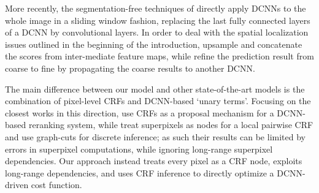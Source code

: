 
More recently, the segmentation-free techniques of \citep{long2014fully, eigen2014predicting} directly apply DCNNs to the whole image in a sliding window fashion, replacing the last fully connected layers of a DCNN  by convolutional layers. In order to deal with the spatial localization issues outlined in the beginning of the introduction, \citet{long2014fully} upsample and concatenate the scores from inter-mediate feature maps, while \citet{eigen2014predicting} refine the prediction result from coarse to fine by propagating the coarse results to another DCNN. 


The main difference between our model and other state-of-the-art models is the combination of pixel-level CRFs and DCNN-based `unary terms'. Focusing on the closest works in this direction, \citet{cogswell2014combining} use CRFs as a proposal mechanism for a DCNN-based reranking system, while \citet{farabet2013learning} treat superpixels as  nodes for a local pairwise CRF and use graph-cuts for discrete inference; as such their results can be limited by errors in superpixel computations, while ignoring  long-range superpixel dependencies. Our approach instead treats every pixel as a CRF node, exploits long-range dependencies, and uses  CRF inference to directly optimize a DCNN-driven cost function. 









